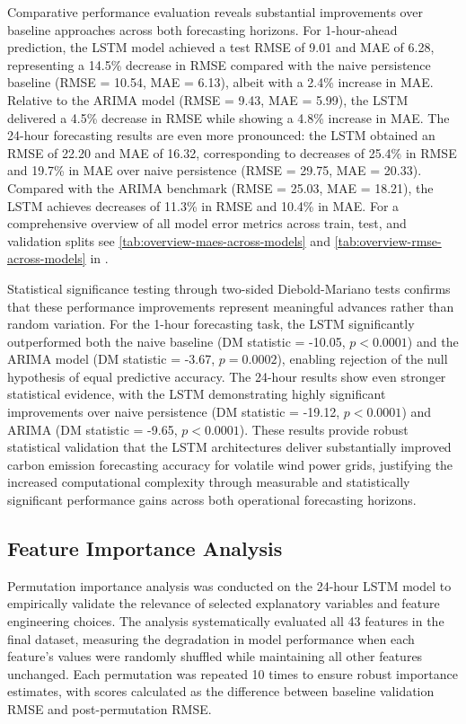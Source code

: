 Comparative performance evaluation reveals substantial improvements over baseline approaches across both forecasting horizons. For 1-hour-ahead prediction, the LSTM model achieved a test RMSE of 9.01 and MAE of 6.28, representing a 14.5\% decrease in RMSE compared with the naive persistence baseline (RMSE = 10.54, MAE = 6.13), albeit with a 2.4\% increase in MAE. Relative to the ARIMA model (RMSE = 9.43, MAE = 5.99), the LSTM delivered a 4.5\% decrease in RMSE while showing a 4.8\% increase in MAE. The 24-hour forecasting results are even more pronounced: the LSTM obtained an RMSE of 22.20 and MAE of 16.32, corresponding to decreases of 25.4\% in RMSE and 19.7\% in MAE over naive persistence (RMSE = 29.75, MAE = 20.33). Compared with the ARIMA benchmark (RMSE = 25.03, MAE = 18.21), the LSTM achieves decreases of 11.3\% in RMSE and 10.4\% in MAE. For a comprehensive overview of all model error metrics across train, test, and validation splits see \autoref{tab:overview-maes-across-models} and \autoref{tab:overview-rmse-across-models} in .

Statistical significance testing through two-sided Diebold-Mariano tests confirms that these performance improvements represent meaningful advances rather than random variation. For the 1-hour forecasting task, the LSTM significantly outperformed both the naive baseline (DM statistic = -10.05, \(p < 0.0001\)) and the ARIMA model (DM statistic = -3.67, \(p = 0.0002\)), enabling rejection of the null hypothesis of equal predictive accuracy. The 24-hour results show even stronger statistical evidence, with the LSTM demonstrating highly significant improvements over naive persistence (DM statistic = -19.12, \(p < 0.0001\)) and ARIMA (DM statistic = -9.65, \(p < 0.0001\)). These results provide robust statistical validation that the LSTM architectures deliver substantially improved carbon emission forecasting accuracy for volatile wind power grids, justifying the increased computational complexity through measurable and statistically significant performance gains across both operational forecasting horizons.

\subsection{Feature Importance Analysis}

Permutation importance analysis was conducted on the 24-hour LSTM model to empirically validate the relevance of selected explanatory variables and feature engineering choices. The analysis systematically evaluated all 43 features in the final dataset, measuring the degradation in model performance when each feature's values were randomly shuffled while maintaining all other features unchanged. Each permutation was repeated 10 times to ensure robust importance estimates, with scores calculated as the difference between baseline validation RMSE and post-permutation RMSE.


